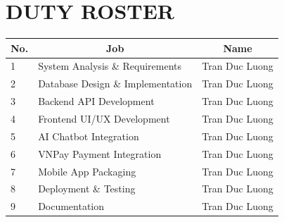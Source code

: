 \section*{DUTY ROSTER}
 {}

\begin{table}[!ht]
\begin{tabular}{|l|l|l|}
\hline
\multicolumn{1}{|c|}{\textbf{No.}} & \multicolumn{1}{c|}{\textbf{Job}}                  & \multicolumn{1}{c|}{\textbf{Name}} \\ \hline
1 & System Analysis \& Requirements & Tran Duc Luong \\ \hline
2 & Database Design \& Implementation & Tran Duc Luong \\ \hline
3 & Backend API Development & Tran Duc Luong \\ \hline
4 & Frontend UI/UX Development & Tran Duc Luong \\ \hline
5 & AI Chatbot Integration & Tran Duc Luong \\ \hline
6 & VNPay Payment Integration & Tran Duc Luong \\ \hline
7 & Mobile App Packaging & Tran Duc Luong \\ \hline
8 & Deployment \& Testing & Tran Duc Luong \\ \hline
9 & Documentation & Tran Duc Luong \\ \hline
\end{tabular}
\end{table}

\newpage